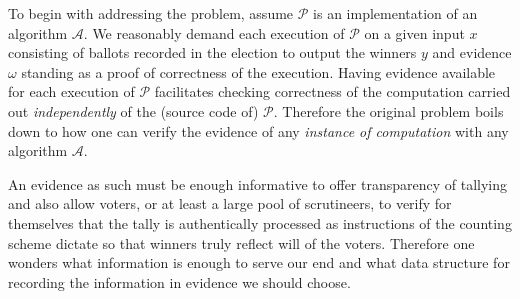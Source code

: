 \documentclass[10pt,conference]{IEEEtran}
\begin{document}
To begin with addressing the problem, assume $\mathcal{P}$ is an implementation of an algorithm $\mathcal{A}$. We reasonably demand each execution of $\mathcal{P}$ on a given input $x$ consisting of ballots recorded in the election to output the winners $y$ and evidence $\omega$ standing as a proof of correctness of the execution.
 Having evidence available for each execution of $\mathcal{P}$ facilitates checking correctness of the computation carried out \emph{independently} of the (source code of) $\mathcal{P}$. Therefore the original problem boils down to how one can verify the evidence of any \emph{instance of computation} with any algorithm $\mathcal{A}$.


An evidence as such must be enough informative to offer transparency of tallying and also allow  voters, or at least a large pool of scrutineers, to verify for themselves that the tally is authentically processed as instructions of the counting scheme dictate so that winners truly reflect will of the voters. 
Therefore one wonders what information is enough 
to serve our end and what data structure for recording the information in evidence we should choose.

\end{document}
